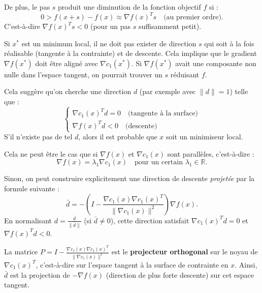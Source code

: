 De plus, le pas $s$ produit une diminution de la fonction objectif $f$ si :
\begin{equation}
    0 > f(x+s) - f(x) \approx \nabla f(x)^T s \quad \text{(au premier ordre)}.
\end{equation}
C'est-à-dire $\nabla f(x)^T s < 0$ (pour un pas $s$ suffisamment petit).

Si $x^*$ est un minimum local, il ne doit pas exister de direction $s$ qui soit à la fois réalisable (tangente à la contrainte) et de descente. Cela implique que le gradient $\nabla f(x^*)$ doit être aligné avec $\nabla c_1(x^*)$. Si $\nabla f(x^*)$ avait une composante non nulle dans l'espace tangent, on pourrait trouver un $s$ réduisant $f$.

Cela suggère qu'on cherche une direction $d$ (par exemple avec $\|d\|=1$) telle que :
\begin{equation}
    \begin{cases}
    \nabla c_1(x)^T d = 0 \quad \text{(tangente à la surface)} \\
    \nabla f(x)^T d < 0 \quad \text{(descente)}
    \end{cases}
\end{equation}
S'il n'existe pas de tel $d$, alors il est probable que $x$ soit un minimiseur local.

Cela ne peut être le cas que si $\nabla f(x)$ et $\nabla c_1(x)$ sont parallèles, c'est-à-dire :
\begin{equation}
    \nabla f(x) = \lambda_1 \nabla c_1(x) \quad \text{pour un certain } \lambda_1 \in \mathbb{R}.
\end{equation}

Sinon, on peut construire explicitement une direction de descente \textit{projetée} par la formule suivante :
\begin{equation}
    \bar{d} = - \left( I - \frac{\nabla c_1(x) \nabla c_1(x)^T}{\|\nabla c_1(x)\|^2} \right) \nabla f(x).
\end{equation}
En normalisant $d = \frac{\bar{d}}{\|\bar{d}\|}$ (si $\bar{d} \neq 0$), cette direction satisfait $\nabla c_1(x)^T d = 0$ et $\nabla f(x)^T d < 0$.

\begin{remarque}
La matrice $P = I - \frac{\nabla c_1(x) \nabla c_1(x)^T}{\|\nabla c_1(x)\|^2}$ est le \textbf{projecteur orthogonal} sur le noyau de $\nabla c_1(x)^T$, c'est-à-dire sur l'espace tangent à la surface de contrainte en $x$. Ainsi, $\bar{d}$ est la projection de $-\nabla f(x)$ (direction de plus forte descente) sur cet espace tangent.
\end{remarque}


